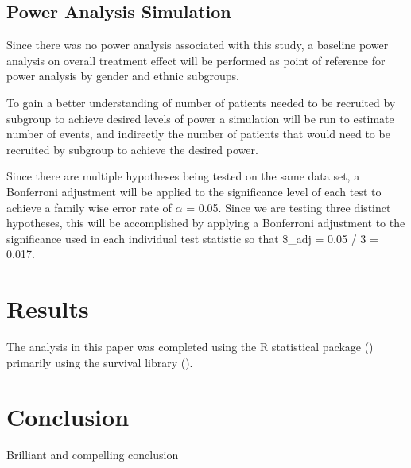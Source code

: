 \documentclass[
  letterpaper,
  DIV=11,
  numbers=noendperiod]{scrartcl}
\begin{document}
\subsection{Power Analysis Simulation}\label{power-analysis-simulation}

Since there was no power analysis associated with this study, a baseline
power analysis on overall treatment effect will be performed as point of
reference for power analysis by gender and ethnic subgroups.

To gain a better understanding of number of patients needed to be
recruited by subgroup to achieve desired levels of power a simulation
will be run to estimate number of events, and indirectly the number of
patients that would need to be recruited by subgroup to achieve the
desired power.

Since there are multiple hypotheses being tested on the same data set, a
Bonferroni adjustment will be applied to the significance level of each
test to achieve a family wise error rate of \(\alpha\) = 0.05. Since we
are testing three distinct hypotheses, this will be accomplished by
applying a Bonferroni adjustment to the significance used in each
individual test statistic so that \$\alpha\_adj = 0.05 / 3 = 0.017.

\section{Results}\label{results}

The analysis in this paper was completed using the R statistical package
() primarily using the survival
library ().

\section{Conclusion}\label{conclusion}

Brilliant and compelling conclusion
\end{document}
